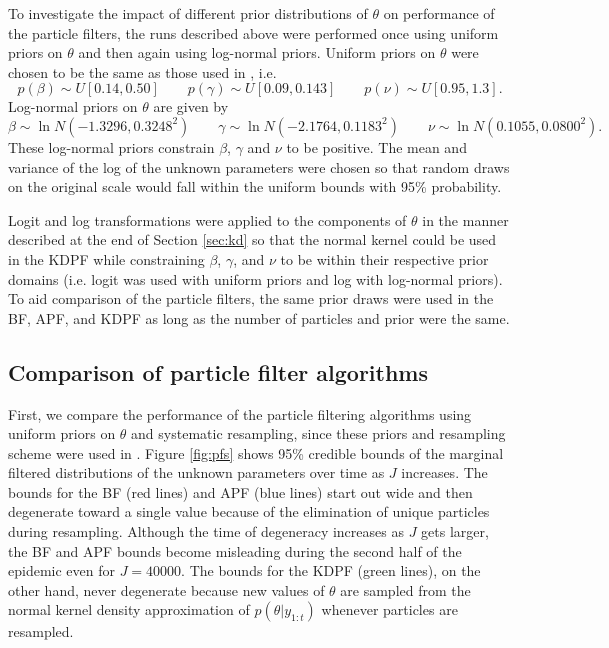 \documentclass{elsarticle}
\begin{document}
To investigate the impact of different prior distributions of $\theta$ on performance of the particle filters, the runs described above were performed once using uniform priors on $\theta$ and then again using log-normal priors. Uniform priors on $\theta$ were chosen to be the same as those used in \citet{skvortsov2012monitoring}, i.e.
\[ p\left(\beta\right) \sim U\left[0.14, 0.50\right] \qquad p\left(\gamma\right) \sim U\left[0.09, 0.143\right] \qquad p\left(\nu\right) \sim U\left[0.95,1.3\right]. \]
\noindent Log-normal priors on $\theta$ are given by
\[ \beta \sim \ln N\left(-1.3296, 0.3248^2\right) \qquad \gamma \sim \ln N\left(-2.1764, 0.1183^2\right) \qquad \nu \sim \ln N\left(0.1055, 0.0800^2\right). \]
\noindent These log-normal priors constrain $\beta$, $\gamma$ and $\nu$ to be positive. The mean and variance of the log of the unknown parameters were chosen so that random draws on the original scale would fall within the uniform bounds with 95\% probability.

Logit and log transformations were applied to the components of $\theta$ in the manner described at the end of Section \ref{sec:kd} so that the normal kernel could be used in the KDPF while constraining $\beta$, $\gamma$, and $\nu$ to be within their respective prior domains (i.e. logit was used with uniform priors and log with log-normal priors). To aid comparison of the particle filters, the same prior draws were used in the BF, APF, and KDPF as long as the number of particles and prior were the same.

\subsection{Comparison of particle filter algorithms} \label{sec:pfcomparison}

First, we compare the performance of the particle filtering algorithms using uniform priors on $\theta$ and systematic resampling, since these priors and resampling scheme were used in \citet{skvortsov2012monitoring}. Figure \ref{fig:pfs} shows 95\% credible bounds of the marginal filtered distributions of the unknown parameters over time as $J$ increases. The bounds for the BF (red lines) and APF (blue lines) start out wide and then degenerate toward a single value because of the elimination of unique particles during resampling. Although the time of degeneracy increases as $J$ gets larger, the BF and APF bounds become misleading during the second half of the epidemic even for $J = 40000$. The bounds for the KDPF (green lines), on the other hand, never degenerate because new values of $\theta$ are sampled from the normal kernel density approximation of $p(\theta|y_{1:t})$ whenever particles are resampled.
\end{document}
